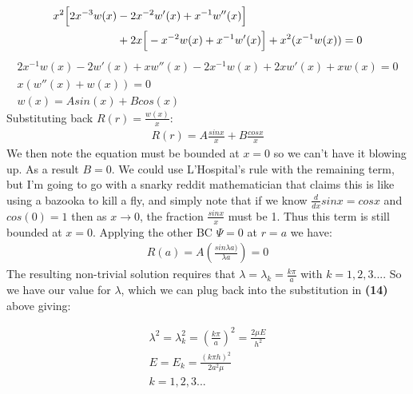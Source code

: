 \documentclass{article}
\begin{document}
\begin{equation}
\begin{aligned}
x^2 \Big{[} 2x^{-3}w(x) &- 2x^{-2}w'(x) + x^{-1}w''(x) \Big{]}\\
 &+ 2x \Big{[}-x^{-2}w(x) + x^{-1}{w'(x)} \Big{]} + x^2(x^{-1}w(x)) = 0\\
\end{aligned}
\end{equation}
\begin{equation}
\begin{aligned}
 2x^{-1}w(x) - 2w'(x) + xw''(x) - 2x^{-1}w(x) + 2xw'(x) + xw(x) = 0\\
 x(w''(x) + w(x)) = 0\\
 w(x) = Asin(x) + Bcos(x)
\end{aligned}
\end{equation}
Substituting back $R(r) = \frac{w(x)}{x}$:
\begin{equation}
\begin{aligned}
R(r) = A\frac{sinx}{x} + B\frac{cosx}{x}
\end{aligned}
\end{equation}
We then note the equation must be bounded at $x=0$ so we can't have it blowing up. As a result $B=0$. We could use L'Hospital's rule with the remaining term, but I'm going to go with a snarky reddit mathematician that claims this is like using a bazooka to kill a fly, and simply note that if we know $\frac{d}{dx}sinx = cosx$ and $cos(0) = 1$ then as $x\to 0$, the fraction $\frac{sinx}{x}$ must be 1. Thus this term is still bounded at $x=0$. Applying the other BC $\Psi=0$ at $r=a$ we have:
\begin{equation}
\begin{aligned}
R(a) = A(\frac{sin\lambda a)}{\lambda a}) = 0
\end{aligned}
\end{equation}
The resulting non-trivial solution requires that $\lambda = \lambda_k=\frac{k\pi}{a}$ with $k=1,2,3...$. So we have our value for $\lambda$, which we can plug back into the substitution in \textbf{(14)} above giving:
\begin{tcolorbox}[minipage,colback=white,arc=0pt,outer arc=0pt]
\begin{equation}
\begin{aligned}
\lambda^2 = \lambda_k^2 = (\frac{k\pi}{a})^2 =  \frac{2\mu E}{h^2}\\
E = E_k = \frac{(k\pi h)^2}{2a^2\mu}\\
k = 1,2,3...
\end{aligned}
\end{equation}
\end{tcolorbox}
\end{document}
